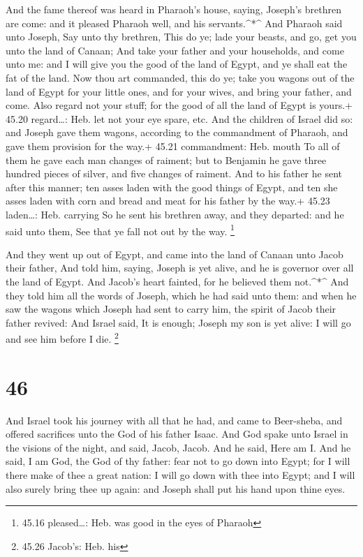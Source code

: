  And the fame thereof was heard in Pharaoh's house, saying,
Joseph's brethren are come: and it pleased Pharaoh well, and his
servants.\^{}*\^{}  And Pharaoh said unto Joseph, Say unto
thy brethren, This do ye; lade your beasts, and go, get you unto the
land of Canaan;  And take your father and your households,
and come unto me: and I will give you the good of the land of Egypt, and
ye shall eat the fat of the land.  Now thou art commanded,
this do ye; take you wagons out of the land of Egypt for your little
ones, and for your wives, and bring your father, and come. 
Also regard not your stuff; for the good of all the land of Egypt is
yours.+ 45.20 regard\ldots: Heb. let not your eye spare, etc.
 And the children of Israel did so: and Joseph gave them
wagons, according to the commandment of Pharaoh, and gave them provision
for the way.+ 45.21 commandment: Heb. mouth  To all of them
he gave each man changes of raiment; but to Benjamin he gave three
hundred pieces of silver, and five changes of raiment.  And
to his father he sent after this manner; ten asses laden with the good
things of Egypt, and ten she asses laden with corn and bread and meat
for his father by the way.+ 45.23 laden\ldots: Heb. carrying
 So he sent his brethren away, and they departed: and he
said unto them, See that ye fall not out by the way. \footnote{45.16
  pleased\ldots: Heb. was good in the eyes of Pharaoh}

 And they went up out of Egypt, and came into the land of
Canaan unto Jacob their father,  And told him, saying,
Joseph is yet alive, and he is governor over all the land of Egypt. And
Jacob's heart fainted, for he believed them not.\^{}*\^{} 
And they told him all the words of Joseph, which he had said unto them:
and when he saw the wagons which Joseph had sent to carry him, the
spirit of Jacob their father revived:  And Israel said, It
is enough; Joseph my son is yet alive: I will go and see him before I
die. \footnote{45.26 Jacob's: Heb. his}

\hypertarget{section-45}{%
\section{46}\label{section-45}}

 And Israel took his journey with all that he had, and came
to Beer-sheba, and offered sacrifices unto the God of his father Isaac.
 And God spake unto Israel in the visions of the night, and
said, Jacob, Jacob. And he said, Here am I.  And he said, I
am God, the God of thy father: fear not to go down into Egypt; for I
will there make of thee a great nation:  I will go down with
thee into Egypt; and I will also surely bring thee up again: and Joseph
shall put his hand upon thine eyes.


